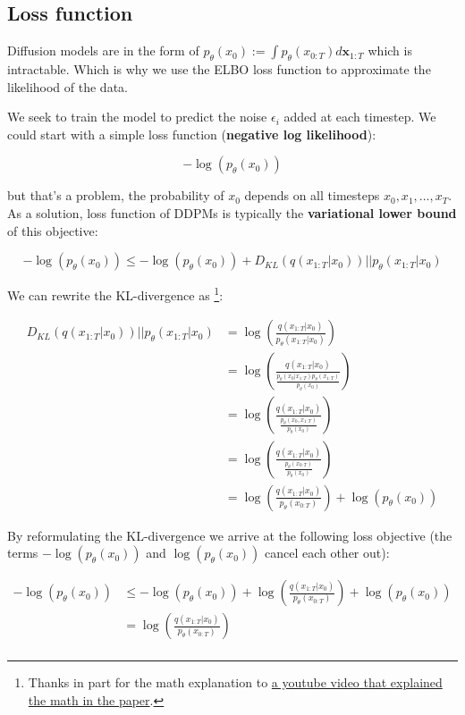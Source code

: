 \subsection{Loss function}

Diffusion models are in the form of $p_\theta (x_0) := \int p_\theta(x_{0:T}) d\mathbf{x}_{1:T}$ which is intractable. Which is why we use the ELBO loss function to approximate the likelihood of the data.

We seek to train the model to predict the noise $\epsilon_i$ added at each timestep. We could start with a simple loss function (\textbf{negative log likelihood}):

\[ -\log (p_\theta (x_0)) \]

but that's a problem, the probability of $x_0$ depends on all timesteps $x_0, x_1, ..., x_T$. As a solution, loss function of DDPMs is typically the \textbf{variational lower bound} of this objective:

\[
    -\log (p_\theta(x_0)) \leq -\log (p_\theta(x_0)) + D_{KL} (q(x_{1:T} | x_0)) \vert \vert p_\theta(x_{1:T} | x_0)
\]

We can rewrite the KL-divergence as \footnote{Thanks in part for the math explanation to \href{https://www.youtube.com/watch?v=HoKDTa5jHvg}{a youtube video that explained the math in the paper}.}:

\begin{align*}
    D_{KL} (q(x_{1:T} | x_0)) \vert \vert p_\theta(x_{1:T} | x_0) &= \log(\frac{q(x_{1:T} | x_0)}{p_\theta(x_{1:T} | x_0)}) \\
    &= \log(\frac{q(x_{1:T} | x_0)}{ \frac{p_\theta(x_0 | x_{1:T}) p_\theta(x_{1:T})}{p_\theta(x_0)} }) \\
    &= \log(\frac{q(x_{1:T} | x_0)}{ \frac{p_\theta(x_0, x_{1:T})}{p_\theta(x_0)} }) \\
    &= \log(\frac{q(x_{1:T} | x_0)}{ \frac{p_\theta(x_{0:T})}{p_\theta(x_0)} }) \\
    &= \log(\frac{q(x_{1:T} | x_0)}{ p_\theta(x_{0:T}) }) + \log(p_\theta(x_0))
\end{align*}

By reformulating the KL-divergence we arrive at the following loss objective (the terms $-\log(p_\theta(x_0))$ and $\log(p_\theta(x_0))$ cancel each other out):

\begin{align*}
    -\log (p_\theta(x_0)) &\leq -\log (p_\theta(x_0)) + \log (\frac{ q(x_{1:T} | x_0) }{ p_\theta (x_{0:T}) }) + \log(p_\theta(x_0)) \\
    &= \log (\frac{ q(x_{1:T} | x_0) }{ p_\theta (x_{0:T}) }) \\
\end{align*}

